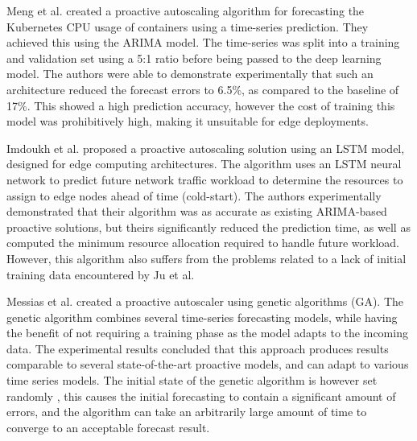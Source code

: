 Meng et al. \cite{meng2016crupa} created a proactive autoscaling algorithm for forecasting the Kubernetes CPU usage of containers using a time-series prediction. They achieved this using the ARIMA model. The time-series was split into a training and validation set using a 5:1 ratio before being passed to the deep learning model. The authors were able to demonstrate experimentally that such an architecture reduced the forecast errors to 6.5\%, as compared to the baseline of 17\%. This showed a high prediction accuracy, however the cost of training this model was prohibitively high, making it unsuitable for edge deployments.\par


Imdoukh et al. \cite{imdoukh2020machine} proposed a proactive autoscaling solution using an LSTM model, designed for edge computing architectures. The algorithm uses an LSTM neural network to predict future network traffic workload to determine the resources to assign to edge nodes ahead of time (cold-start). The authors experimentally demonstrated that their algorithm was as accurate as existing ARIMA-based proactive solutions, but theirs significantly reduced the prediction time, as well as computed the minimum resource allocation required to handle future workload. However, this algorithm also suffers from the problems related to a lack of initial training data encountered by Ju et al. \cite{ju2021proactive}\par


Messias et al. \cite{messias2016combining} created a proactive autoscaler using genetic algorithms (GA). The genetic algorithm combines several time-series forecasting models, while having the benefit of not requiring a training phase as the model adapts to the incoming data. The experimental results concluded that this approach produces results comparable to several state-of-the-art proactive models, and can adapt to various time series models. The initial state of the genetic algorithm is however set randomly \cite{lambora2019genetic}, this causes the initial forecasting to contain a significant amount of errors, and the algorithm can take an arbitrarily large amount of time to converge to an acceptable forecast result.\par

